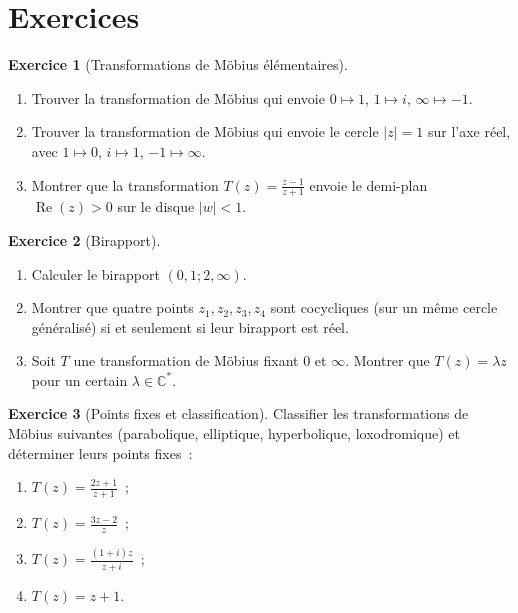 \documentclass[12pt,a4paper,openany]{book}
\theoremstyle{definition}
\newtheorem{exercice}{Exercice}[chapter]
\theoremstyle{plain}
\theoremstyle{remark}
\newcommand{\C}{\mathbb{C}}
\DeclareMathOperator{\re}{Re}
\newcommand{\abs}[1]{\left|#1\right|}
\begin{document}
\section{Exercices}\label{sec:exo-conforme}

\begin{exercice}[Transformations de Möbius élémentaires]\label{exo:mobius-elem}
\begin{enumerate}[label=\alph*)]
  \item Trouver la transformation de Möbius qui envoie $0 \mapsto 1$,
    $1 \mapsto i$, $\infty \mapsto -1$.
  \item Trouver la transformation de Möbius qui envoie le cercle $\abs{z} = 1$
    sur l'axe réel, avec $1 \mapsto 0$, $i \mapsto 1$, $-1 \mapsto \infty$.
  \item Montrer que la transformation $T(z) = \frac{z-1}{z+1}$ envoie le
    demi-plan $\re(z) > 0$ sur le disque $\abs{w} < 1$.
\end{enumerate}
\end{exercice}

\begin{exercice}[Birapport]\label{exo:birapport}
\begin{enumerate}[label=\alph*)]
  \item Calculer le birapport $(0, 1; 2, \infty)$.
  \item Montrer que quatre points $z_1, z_2, z_3, z_4$ sont cocycliques
    (sur un même cercle généralisé) si et seulement si leur birapport est réel.
  \item Soit $T$ une transformation de Möbius fixant $0$ et $\infty$.
    Montrer que $T(z) = \lambda z$ pour un certain $\lambda \in \C^*$.
\end{enumerate}
\end{exercice}

\begin{exercice}[Points fixes et classification]\label{exo:classif-mobius}
Classifier les transformations de Möbius suivantes (parabolique, elliptique,
hyperbolique, loxodromique) et déterminer leurs points fixes~:
\begin{enumerate}[label=\alph*)]
  \item $T(z) = \frac{2z+1}{z+1}$~;
  \item $T(z) = \frac{3z-2}{z}$~;
  \item $T(z) = \frac{(1+i)z}{z+i}$~;
  \item $T(z) = z + 1$.
\end{enumerate}
\end{exercice}
\end{document}

